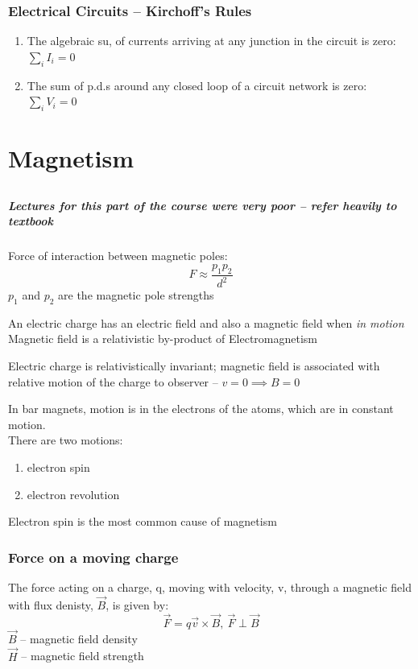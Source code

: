\documentclass[a4paper, 11pt, fleqn, normalem]{report}
\begin{document}
\section{Electrical Circuits -- Kirchoff's Rules}
\begin{enumerate}
    \item The algebraic su, of currents arriving at any junction in the circuit is zero: $\sum_{i} I_{i} = 0$
    \item The sum of p.d.s around any closed loop of a circuit network is zero: $\sum_{i} V_{i} = 0$
\end{enumerate}

\part{Magnetism}
\chapter{}
\subsubsection{Lectures for this part of the course were very poor -- refer heavily to textbook}

Force of interaction between magnetic poles:
\begin{equation*}
    F \approx \frac{p_{1}p_{2}}{d^{2}}
\end{equation*}
$p_{1}$ and $p_{2}$ are the magnetic pole strengths

An electric charge has an electric field and also a magnetic field when \emph{in motion} \\
Magnetic field is a relativistic by-product of Electromagnetism

Electric charge is relativistically invariant; magnetic field is associated with relative motion of the charge to observer -- $v = 0 \implies B = 0$

In bar magnets, motion is in the electrons of the atoms, which are in constant motion. \\
There are two motions:
\begin{enumerate}
    \item electron spin
    \item electron revolution
\end{enumerate}
Electron spin is the most common cause of magnetism

\section{Force on a moving charge}
The force acting on a charge, q, moving with velocity, v, through a magnetic field with flux denisty, $\vec{B}$, is given by:
\begin{equation*}
    \vec{F} = q\vec{v} \times \vec{B}, ~ \vec{F} \perp \vec{B}
\end{equation*}
$\vec{B}$ -- magnetic field density \\
$\vec{H}$ -- magnetic field strength
\end{document}
